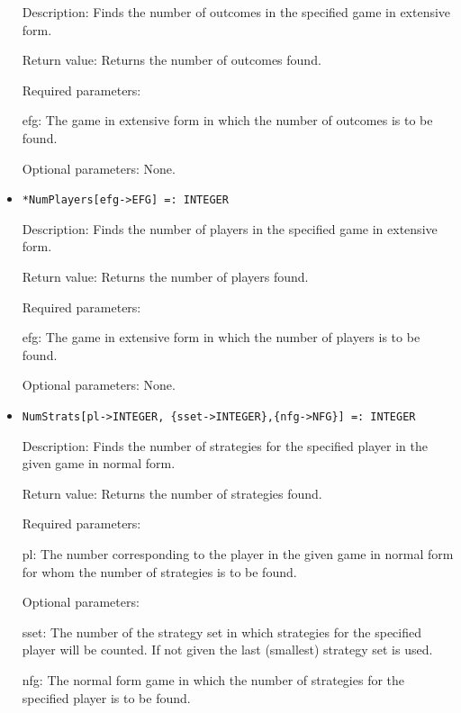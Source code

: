 \begin{itemize}
\bd
\item
[Description:] Finds the number of outcomes in the specified game
in extensive form.
\item
[Return value:] Returns the number of outcomes found.
\item
[Required parameters:] \hfil\null

\bd
\item
[efg:] The game in extensive form in which the number of outcomes is
to be found.
\ed

\item
[Optional parameters:] None.
\ed

\item
\protect \large \begin{verbatim}
*NumPlayers[efg->EFG] =: INTEGER
\end{verbatim} \normalsize

\bd
\item
[Description:] Finds the number of players in the specified game in
extensive form.
\item
[Return value:] Returns the number of players found.
\item
[Required parameters:]\hfil\null

\bd
\item
[efg:] The game in extensive form in which the number of players is
to be found.
\ed

\item   
[Optional parameters:] None.
\ed

\item
\protect \large \begin{verbatim}
NumStrats[pl->INTEGER, {sset->INTEGER},{nfg->NFG}] =: INTEGER
\end{verbatim}\normalsize
\bd

\item
[Description:] Finds the number of strategies for the specified player
in the given game in normal form.
\item
[Return value:] Returns the number of strategies found.
\item
[Required parameters:]\hfil\null

\bd
\item
[pl:] The number corresponding to the player in the given game in
normal form for whom the number of strategies is to be found.
\ed

\item
[Optional parameters:]\hfil\null
	
\bd
\item  
[sset:] The number of the strategy set in which strategies for the
specified player will be counted.  If not given the last (smallest)
strategy set is used.
\item
[nfg:] The normal form game in which the number of strategies for the
specified player is to be found.


\end{itemize}
